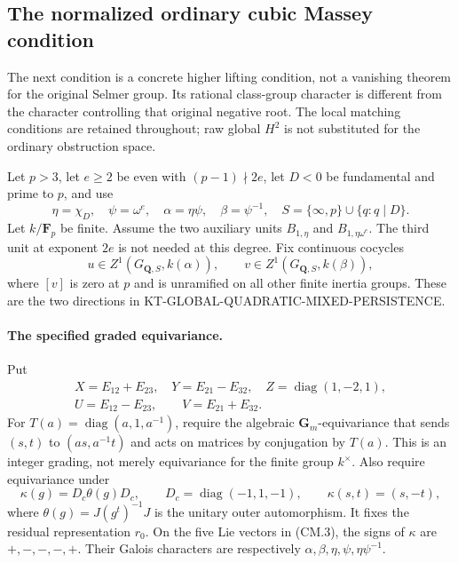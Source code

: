 \subsection{The normalized ordinary cubic Massey condition}
\label{sec:kt-cubic-massey-condition}

The next condition is a concrete higher lifting condition, not a
vanishing theorem for the original Selmer group.  Its rational
class-group character is different from the character controlling
that original negative root.  The local matching conditions are
retained throughout; raw global $H^2$ is not substituted for the
ordinary obstruction space.

Let $p>3$, let $e\ge2$ be even with $(p-1)\nmid2e$, let
$D<0$ be fundamental and prime to $p$, and use
\[
 \eta=\chi_D,\quad \psi=\omega^e,\quad
 \alpha=\eta\psi,\quad\beta=\psi^{-1},\quad
 S=\{\infty,p\}\cup\{q:q\mid D\}.
                                                               \tag{CM.1}
\]
Let $k/\mathbf F_p$ be finite.  Assume the two auxiliary units
$B_{1,\eta}$ and $B_{1,\eta\omega^e}$.
The third unit at exponent $2e$ is not needed at this degree.
Fix continuous cocycles
\[
 u\in Z^1(G_{\mathbf Q,S},k(\alpha)),\qquad
 v\in Z^1(G_{\mathbf Q,S},k(\beta)),
                                                               \tag{CM.2}
\]
where $[v]$ is zero at $p$ and is unramified on all other finite
inertia groups.  These are the two directions in
KT-GLOBAL-QUADRATIC-MIXED-PERSISTENCE.

\paragraph{The specified graded equivariance.}
Put
\[
\begin{gathered}
 X=E_{12}+E_{23},\quad Y=E_{21}-E_{32},\quad
 Z=\operatorname{diag}(1,-2,1),\\
 U=E_{12}-E_{23},\qquad V=E_{21}+E_{32}.
\end{gathered}                                                 \tag{CM.3}
\]
For $T(a)=\operatorname{diag}(a,1,a^{-1})$, require the algebraic
$\mathbf G_m$-equivariance that sends $(s,t)$ to $(as,a^{-1}t)$
and acts on matrices by conjugation by $T(a)$.  This is an
integer grading, not merely equivariance for the finite group
$k^\times$.  Also require equivariance under
\[
 \kappa(g)=D_c\theta(g)D_c,\qquad
 D_c=\operatorname{diag}(-1,1,-1),\qquad
 \kappa(s,t)=(s,-t),                                    \tag{CM.4}
\]
where $\theta(g)=J(g^t)^{-1}J$ is the unitary outer automorphism.
It fixes the residual representation $r_0$.
On the five Lie vectors in (CM.3), the signs of $\kappa$ are
$+,-,-,-,+$.  Their Galois characters are respectively
$\alpha,\beta,\eta,\psi,\eta\psi^{-1}$.

